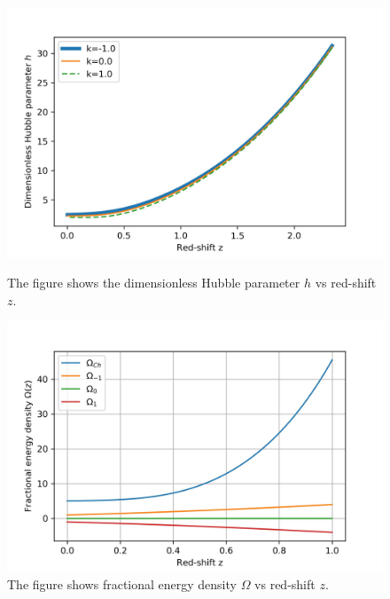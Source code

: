 \documentclass[8pt,hideothersubsections]{beamer}
\begin{document}
\begin{frame}
\begin{figure}[ht]
    \begin{minipage}{0.49\linewidth}
        \centering
        \includegraphics[width=\textwidth]{./Images/ch_H.jpg}
		\caption{The figure shows the dimensionless Hubble parameter $h$ vs red-shift $z$.}
		\label{fig:ChH}
    \end{minipage}
    \begin{minipage}{0.49\linewidth}
        \centering
        \includegraphics[width=\textwidth]{./Images/ch_Om.jpg}
		\caption{The figure shows fractional energy density $\Omega$ vs red-shift $z$.}
		\label{fig:ChFracEnDen}
    \end{minipage}
\end{figure}

\end{frame}
\end{document}
